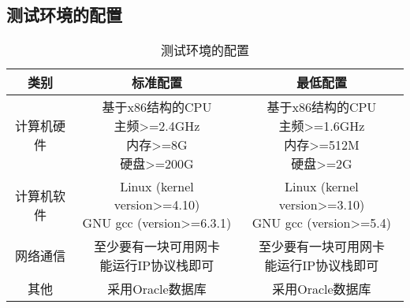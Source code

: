\subsection{测试环境的配置}
\begin{table}[htbp]
\centering
\caption{测试环境的配置} \label{tab:test-environment}
\begin{tabular}{|c|c|c|}
    \hline
    类别 & 标准配置 & 最低配置 \\
    \hline
    计算机硬件 & \tabincell{c}{基于x86结构的CPU\\ 主频>=2.4GHz\\ 内存>=8G\\ 硬盘>=200G} & \tabincell{c}{基于x86结构的CPU\\ 主频>=1.6GHz\\ 内存>=512M\\ 硬盘>=2G} \\
    \hline
    计算机软件 & \tabincell{c}{Linux (kernel version>=4.10)\\ GNU gcc (version>=6.3.1)} & \tabincell{c}{Linux (kernel version>=3.10)\\ GNU gcc (version>=5.4)} \\
    \hline
    网络通信 & \tabincell{c}{至少要有一块可用网卡\\ 能运行IP协议栈即可} & \tabincell{c}{至少要有一块可用网卡\\ 能运行IP协议栈即可} \\
    \hline
    其他 & 采用Oracle数据库 & 采用Oracle数据库 \\
    \hline

\end{tabular}
\end{table}

